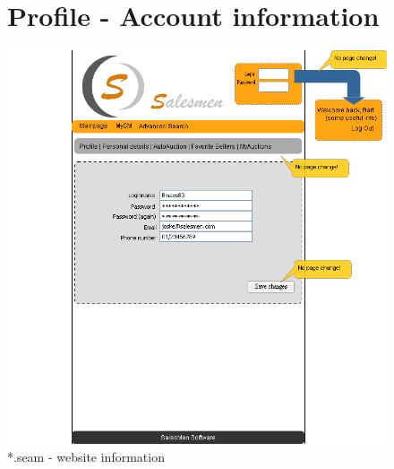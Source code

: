 \documentclass[salesmen, twoside]{../../../templates/latex/2009/softproj}
\begin{document}
\begin{projdoc}
\begin{figure}
\section{Profile - Account information}
\label{fig_prototype_account_info}
\includegraphics[width=15cm]{../../img/SM_mySM_profile.png}
\caption{*.seam - website information}
\end{figure}

\end{projdoc}
\end{document}
